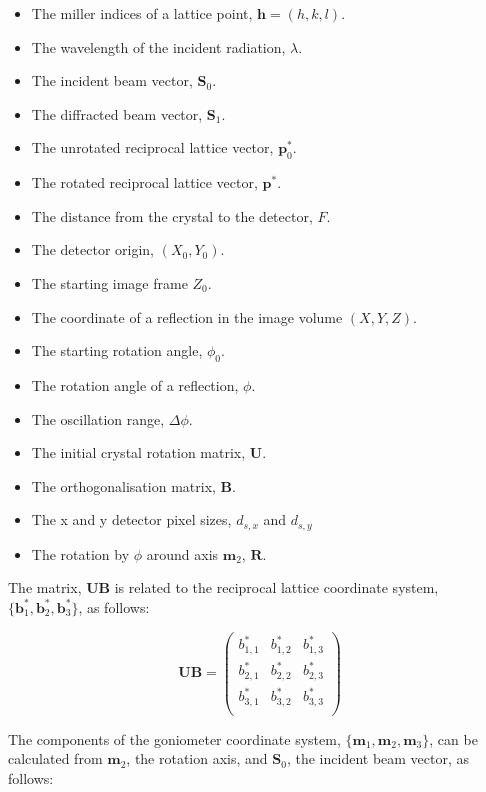 \documentclass[a4paper,10pt]{article}
\begin{document}
\begin{itemize}
  \item The miller indices of a lattice point, $\bm{h} = (h, k, l)$.
  \item The wavelength of the incident radiation, $\lambda$.
  \item The incident beam vector, $\bm{S}_0$. 
  \item The diffracted beam vector, $\bm{S}_1$.
  \item The unrotated reciprocal lattice vector, $\bm{p}_0^*$. 
  \item The rotated reciprocal lattice vector, $\bm{p}^*$.
  \item The distance from the crystal to the detector, $F$.
  \item The detector origin, $(X_0, Y_0)$.
  \item The starting image frame $Z_0$.
  \item The coordinate of a reflection in the image volume $(X, Y, Z)$.
  \item The starting rotation angle, $\phi _0$.
  \item The rotation angle of a reflection, $\phi$.
  \item The oscillation range, $\Delta \phi$.
  \item The initial crystal rotation matrix, $\bm{U}$.
  \item The orthogonalisation matrix, $\bm{B}$.
  \item The x and y detector pixel sizes, $d_{s,x}$ and $d_{s,y}$
  \item The rotation by $\phi$ around axis $\bm{m}_2$, $\bm{R}$.
\end{itemize}

\noindent
The matrix, $\bm{U} \bm{B}$ is related to the reciprocal lattice coordinate
system, $\{\bm{b}_1^*, \bm{b}_2^*, \bm{b}_3^*\}$,  as follows:

\begin{equation}
  \bm{U} \bm{B} = 
    \begin{pmatrix}
        b_{1,1}^* & b_{1,2}^* & b_{1,3}^* \\
        b_{2,1}^* & b_{2,2}^* & b_{2,3}^* \\
        b_{3,1}^* & b_{3,2}^* & b_{3,3}^* \\ 
    \end{pmatrix}
  \label{ub-b* relation}
\end{equation}


\noindent
The components of the goniometer coordinate system, 
$\{\bm{m}_1,   \bm{m}_2,   \bm{m}_3  \}$, can be calculated from $\bm{m}_2$, 
the rotation axis, and $\bm{S}_0$, the incident beam vector, as follows:
\end{document}
